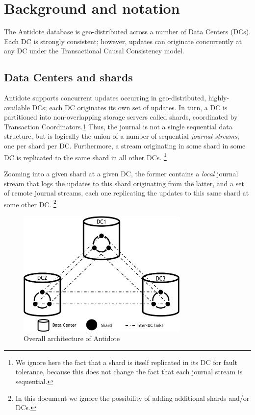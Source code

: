 \documentclass[twoside]{article}
\begin{document}
\section{Background and notation}
\label{sec:background}
The Antidote database is geo-distributed across a number of Data Centers
(DCs).
Each DC is strongly consistent; however, updates can originate
concurrently at any DC under the Transactional Causal Consistency model.

\subsection{Data Centers and shards}
\label{sec:dc-shards}
Antidote supports concurrent updates occurring in geo-distributed,
highly-available DCs; each DC originates its own set of updates.
In turn, a DC is partitioned into non-overlapping storage servers called
shards, coordinated by Transaction Coordinators.\ref{fig:architecture}
Thus, the journal is not a single sequential data structure, but is
logically the union of a number of sequential \emph{journal streams},
one per shard per DC\@.
Furthermore, a stream originating in some shard in some DC is replicated
to the same shard in all other DCs.%
%
\footnote{
%
  We ignore here the fact that a shard is itself replicated in its DC
  for fault tolerance, because this does not change the fact that each
  journal stream is sequential.
}
%

Zooming into a given shard at a given DC, the former contains a \emph{local}
journal stream that logs the updates to this shard originating from the latter,
and a set of remote journal streams, each one replicating the
updates to this same shard at some other DC\@.
%
\footnote{
  In this document we ignore the possibility of adding additional shards 
  and/or DCs. 
}

\begin{figure}[tp]
  \centering
  \includegraphics[width=0.75\textwidth]{figures/datacentres.png}
  \caption{Overall architecture of Antidote}
  \label{fig:architecture}
\end{figure}
\end{document}
